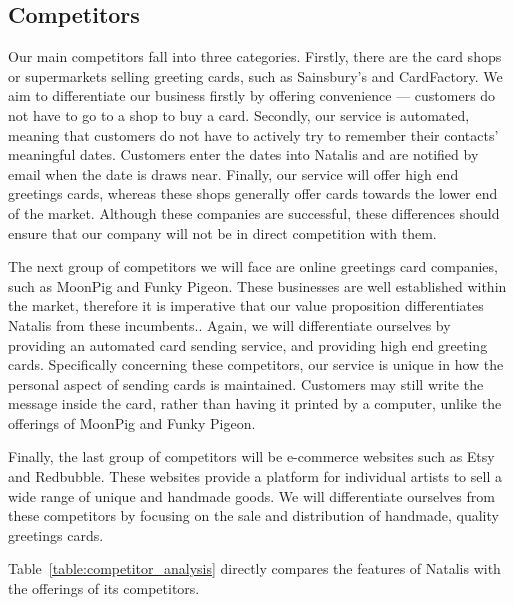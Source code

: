 \documentclass[10pt,a4paper]{article}
\begin{document}
\subsection*{Competitors}
Our main competitors fall into three categories. Firstly, there are the card shops or supermarkets selling greeting cards, such as Sainsbury's and CardFactory. We aim to differentiate our business firstly by offering convenience --- customers do not have to go to a shop to buy a card. Secondly, our service is automated, meaning that customers do not have to actively try to remember their contacts' meaningful dates. Customers enter the dates into Natalis and are notified by email when the date is draws near.  Finally, our service will offer high end greetings cards, whereas these shops generally offer cards towards the lower end of the market. Although these companies are successful, these differences should ensure that our company will not be in direct competition with them.

The next group of competitors we will face are online greetings card companies, such as MoonPig and Funky Pigeon. These businesses are well established within the market, therefore it is imperative that our value proposition differentiates Natalis from these incumbents..
Again, we will differentiate ourselves by providing an automated card sending service, and providing high end greeting cards. Specifically concerning these competitors, our service is unique in how the personal aspect of sending cards is maintained. Customers may still write the message inside the card, rather than having it printed by a computer, unlike the offerings of MoonPig and Funky Pigeon.

Finally, the last group of competitors will be e-commerce websites such as Etsy and Redbubble. These websites provide a platform for individual artists to sell a wide range of unique and handmade goods. We will differentiate ourselves from these competitors by focusing on the sale and distribution of handmade, quality greetings cards.

Table~\ref{table:competitor_analysis} directly compares the features of Natalis with the offerings of its competitors.
\end{document}
